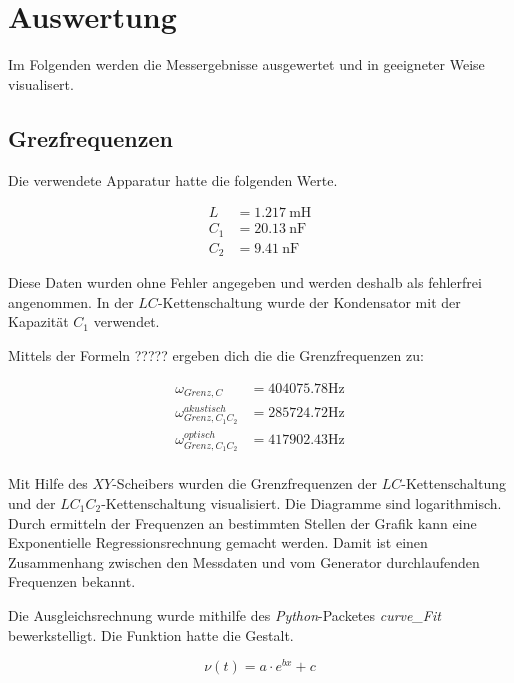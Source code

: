 



\section{Auswertung}

Im Folgenden werden die Messergebnisse ausgewertet und in geeigneter
Weise visualisert.

\subsection{Grezfrequenzen}

Die verwendete Apparatur hatte die folgenden Werte.

\begin{align}
  \label{L}
  L &= \SI{1,217}{\milli\henry}\\
  \label{C1}
  C_1 &= \SI{20,13}{\nano\farad}\\
  \label{C2}
  C_2 &= \SI{9,41}{\nano\farad}
\end{align}

Diese Daten wurden ohne Fehler angegeben und werden deshalb als fehlerfrei
angenommen. In der $LC$-Kettenschaltung wurde der Kondensator mit der
Kapazität $C_1$ verwendet.

Mittels der Formeln ????? ergeben dich die die Grenzfrequenzen zu:

\begin{align*}
  \omega_{Grenz,C} &= \num{404075,78}\si{\hertz}\\
  \omega_{Grenz,C_1C_2}^{akustisch} &= \num{285724,72}\si{\hertz}\\
  \omega_{Grenz,C_1C_2}^{optisch} &= \num{417902,43}\si{\hertz}\\
\end{align*}

Mit Hilfe des $XY$-Scheibers wurden die Grenzfrequenzen der $LC$-Kettenschaltung
und der $LC_1C_2$-Kettenschaltung visualisiert. Die Diagramme sind
logarithmisch. Durch ermitteln der Frequenzen an bestimmten Stellen der
Grafik kann eine Exponentielle Regressionsrechnung gemacht werden.
Damit ist einen Zusammenhang zwischen den Messdaten und vom Generator durchlaufenden
Frequenzen bekannt.

Die Ausgleichsrechnung wurde mithilfe des \emph{Python}-Packetes
\emph{curve\_Fit} bewerkstelligt. Die Funktion hatte die Gestalt.

\begin{equation}
  \nu(t) = a\cdot e^{bx}+c
\end{equation}

